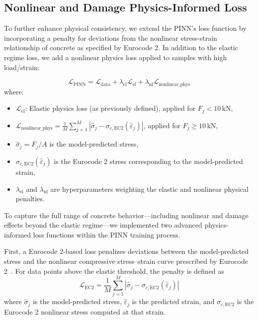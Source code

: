 \documentclass{article}
\begin{document}
\subsection{Nonlinear and Damage Physics-Informed Loss}

To further enhance physical consistency, we extend the PINN’s loss function by incorporating a penalty for deviations from the nonlinear stress-strain relationship of concrete as specified by Eurocode 2. In addition to the elastic regime loss, we add a nonlinear physics loss applied to samples with high load/strain:

\begin{equation}
    \mathcal{L}_{\mathrm{PINN}} = \mathcal{L}_{\mathrm{data}} + \lambda_{\mathrm{el}} \mathcal{L}_{\mathrm{el}} + \lambda_{\mathrm{nl}} \mathcal{L}_{\mathrm{nonlinear\_phys}}
\end{equation}
where:
\begin{itemize}
    \item $\mathcal{L}_{\mathrm{el}}$: Elastic physics loss (as previously defined), applied for $F_j < 10$\,kN,
    \item $\mathcal{L}_{\mathrm{nonlinear\_phys}} = \frac{1}{M} \sum_{j=1}^{M} \left| \hat{\sigma}_j - \sigma_{c,\mathrm{EC2}}(\hat{\varepsilon}_j) \right|$, applied for $F_j \geq 10$\,kN,
    \item $\hat{\sigma}_j = F_j/A$ is the model-predicted stress,
    \item $\sigma_{c,\mathrm{EC2}}(\hat{\varepsilon}_j)$ is the Eurocode 2 stress corresponding to the model-predicted strain,
    \item $\lambda_{\mathrm{el}}$ and $\lambda_{\mathrm{nl}}$ are hyperparameters weighting the elastic and nonlinear physical penalties.
\end{itemize}

To capture the full range of concrete behavior—including nonlinear and damage effects beyond the elastic regime—we implemented two advanced physics-informed loss functions within the PINN training process.

First, a Eurocode 2-based loss penalizes deviations between the model-predicted stress and the nonlinear compressive stress–strain curve prescribed by Eurocode 2~\cite{EC2}. For data points above the elastic threshold, the penalty is defined as
\begin{equation}
\mathcal{L}_{\mathrm{EC2}} = \frac{1}{M} \sum_{j=1}^{M} \left| \hat{\sigma}_j - \sigma_{c,\mathrm{EC2}}(\hat{\varepsilon}_j) \right|
\end{equation}
where $\hat{\sigma}_j$ is the model-predicted stress, $\hat{\varepsilon}_j$ is the predicted strain, and $\sigma_{c,\mathrm{EC2}}$ is the Eurocode 2 nonlinear stress computed at that strain.
\end{document}
